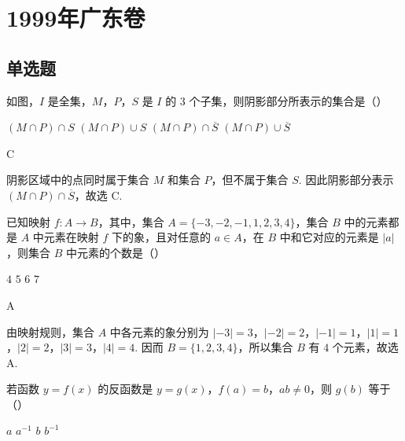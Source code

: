 \chapter{1999年广东卷}

\section{单选题}

\begin{problem}
如图，\(I\) 是全集，\(M\)，\(P\)，\(S\) 是 \(I\) 的 \(3\) 个子集，则阴影部分所表示的集合是（\quad）


\choices
    {\((M\cap P)\cap S\)}
    {\((M\cap P)\cup S\)}
    {\((M\cap P)\cap \overline{S}\)}
    {\((M\cap P)\cup \overline{S}\)}
\end{problem}

\begin{answer}
C
\end{answer}

\begin{solution}
阴影区域中的点同时属于集合 \(M\) 和集合 \(P\)，但不属于集合 \(S\). 因此阴影部分表示
\((M\cap P)\cap\overline{S}\)，故选 C.
\end{solution}

\begin{problem}
已知映射 \(f:A\to B\)，其中，集合 \(A=\{-3,-2,-1,1,2,3,4\}\)，集合 \(B\) 中的元素都是 \(A\) 中元素在映射 \(f\) 下的象，且对任意的 \(a\in A\)，在 \(B\) 中和它对应的元素是 \(|a|\)，则集合 \(B\) 中元素的个数是（\quad）

\choices
    {\(4\)}
    {\(5\)}
    {\(6\)}
    {\(7\)}
\end{problem}

\begin{answer}
A
\end{answer}

\begin{solution}
由映射规则，集合 \(A\) 中各元素的象分别为
\(|-3|=3\)，\(|-2|=2\)，\(|-1|=1\)，\(|1|=1\)，\(|2|=2\)，\(|3|=3\)，\(|4|=4\). 因而
\(B=\{1,2,3,4\}\)，所以集合 \(B\) 有 \(4\) 个元素，故选 A.
\end{solution}

\begin{problem}
若函数 \(y=f(x)\) 的反函数是 \(y=g(x)\)，\(f(a)=b\)，\(ab\neq 0\)，则 \(g(b)\) 等于（\quad）

\choices
    {\(a\)}
    {\(a^{-1}\)}
    {\(b\)}
    {\(b^{-1}\)}
\end{problem}

